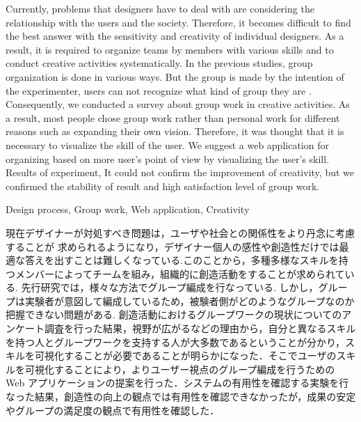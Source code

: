 \documentclass{funthesis}
\begin{document}
\maketitle       %

\begin{eabstract}
Currently, problems that designers have to deal with are considering the relationship with the users and the society. Therefore, it becomes difficult to find the best answer with the sensitivity and creativity of individual designers. As a result, it is required to organize teams by members with various skills and to conduct creative activities systematically.
In the previous studies,  group organization is done in various ways. 
But the group is made by the intention of the experimenter, users can not recognize what kind of group they are .
Consequently, we conducted a survey about group work in creative activities. As a result, most people chose group work rather than personal work for different reasons such as expanding their own vision. Therefore, it was thought that it is necessary to visualize the skill of the user. 
We suggest a web application for organizing based on more user's point of view by visualizing the user's skill. 
Results of experiment, It could not confirm the improvement of creativity, but we confirmed the stability of result and high satisfaction level of group work.
\end{eabstract}

\begin{ekeyword}
Design process, Group work, Web application, Creativity
\end{ekeyword}

\begin{jabstract}
現在デザイナーが対処すべき問題は，ユーザや社会との関係性をより丹念に考慮することが 求められるようになり，デザイナー個人の感性や創造性だけでは最適な答えを出すことは難しくなっている.このことから，多種多様なスキルを持つメンバーによってチームを組み，組織的に創造活動をすることが求められている.  先行研究では，様々な方法でグループ編成を行なっている.  しかし，グループは実験者が意図して編成しているため，被験者側がどのようなグループなのか把握できない問題がある.  創造活動におけるグループワークの現状についてのアンケート調査を行った結果，視野が広がるなどの理由から，自分と異なるスキルを持つ人とグループワークを支持する人が大多数であるということが分かり，スキルを可視化することが必要であることが明らかになった．そこでユーザのスキルを可視化することにより，よりユーザー視点のグループ編成を行うための Web アプリケーションの提案を行った．システムの有用性を確認する実験を行なった結果，創造性の向上の観点では有用性を確認できなかったが，成果の安定やグループの満足度の観点で有用性を確認した．
\end{jabstract}
\end{document}

